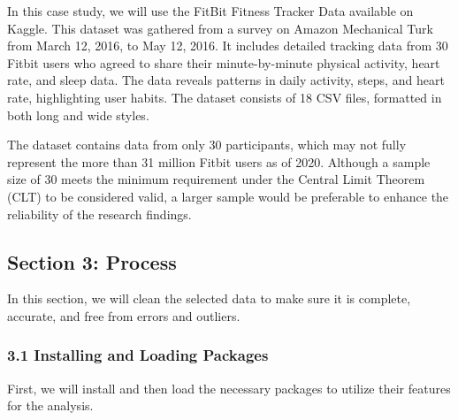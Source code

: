 \documentclass[
]{article}
\begin{document}
In this case study, we will use the FitBit Fitness Tracker Data
available on Kaggle. This dataset was gathered from a survey on Amazon
Mechanical Turk from March 12, 2016, to May 12, 2016. It includes
detailed tracking data from 30 Fitbit users who agreed to share their
minute-by-minute physical activity, heart rate, and sleep data. The data
reveals patterns in daily activity, steps, and heart rate, highlighting
user habits. The dataset consists of 18 CSV files, formatted in both
long and wide styles.

The dataset contains data from only 30 participants, which may not fully
represent the more than 31 million Fitbit users as of 2020. Although a
sample size of 30 meets the minimum requirement under the Central Limit
Theorem (CLT) to be considered valid, a larger sample would be
preferable to enhance the reliability of the research findings.

\hypertarget{section-3-process}{%
\subsection{Section 3: Process}\label{section-3-process}}

In this section, we will clean the selected data to make sure it is
complete, accurate, and free from errors and outliers.

\hypertarget{installing-and-loading-packages}{%
\subsubsection{3.1 Installing and Loading
Packages}\label{installing-and-loading-packages}}

First, we will install and then load the necessary packages to utilize
their features for the analysis.
\end{document}
